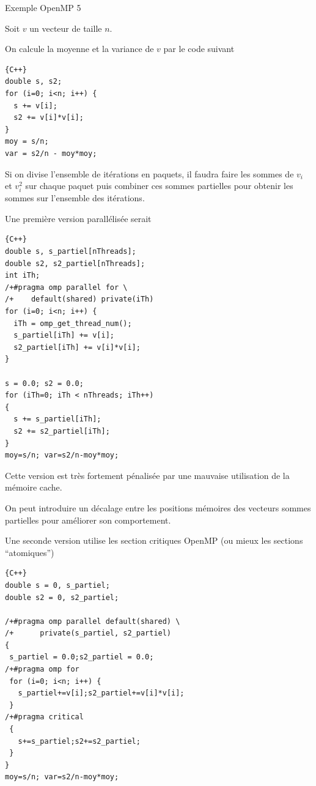 \documentclass{beamer}
\begin{document}
\begin{frame}[fragile]
	Exemple OpenMP 5
	\vfill
	
	Soit $v$ un vecteur de taille $n$.
	
	\vfill
	On calcule la moyenne et la variance de $v$ par le code suivant
	
\begin{lstlisting}{C++}
double s, s2;
for (i=0; i<n; i++) {
  s += v[i];
  s2 += v[i]*v[i];
}
moy = s/n;
var = s2/n - moy*moy;
\end{lstlisting}
	\vfill

Si on divise l'ensemble de itérations en paquets, il faudra faire les sommes de $v_i$ et $v_i^2$ sur chaque paquet puis combiner ces sommes partielles pour obtenir les sommes sur l'ensemble des itérations.	\vfill

\end{frame}

\begin{frame}[fragile]
	Une première version parallélisée serait
	
	\vfill
\begin{lstlisting}{C++}
double s, s_partiel[nThreads];
double s2, s2_partiel[nThreads];
int iTh;
/+#pragma omp parallel for \
/+    default(shared) private(iTh)
for (i=0; i<n; i++) {
  iTh = omp_get_thread_num();
  s_partiel[iTh] += v[i];
  s2_partiel[iTh] += v[i]*v[i];
}

s = 0.0; s2 = 0.0;
for (iTh=0; iTh < nThreads; iTh++)
{
  s += s_partiel[iTh];
  s2 += s2_partiel[iTh];
}
moy=s/n; var=s2/n-moy*moy;
\end{lstlisting}
	
\end{frame}

\begin{frame}
	Cette version est très fortement pénalisée par une mauvaise utilisation de la mémoire cache.
	
	On peut introduire un décalage entre les positions mémoires des vecteurs sommes partielles pour améliorer son comportement.
\end{frame}

\begin{frame}[fragile]
	Une seconde version utilise les section critiques OpenMP (ou mieux les sections ``atomiques'')
	
	\vfill
{}
\begin{lstlisting}{C++}
double s = 0, s_partiel;
double s2 = 0, s2_partiel;

/+#pragma omp parallel default(shared) \
/+      private(s_partiel, s2_partiel) 
{
 s_partiel = 0.0;s2_partiel = 0.0;
/+#pragma omp for
 for (i=0; i<n; i++) {
   s_partiel+=v[i];s2_partiel+=v[i]*v[i];
 }
/+#pragma critical
 {
   s+=s_partiel;s2+=s2_partiel;
 }
}
moy=s/n; var=s2/n-moy*moy;
\end{lstlisting}

	
\end{frame}
\end{document}
